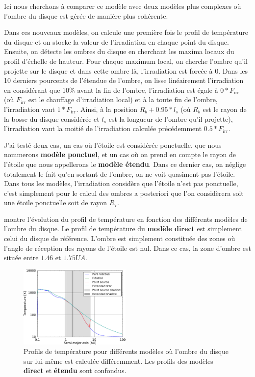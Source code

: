 Ici nous cherchons à comparer ce modèle avec deux modèles plus complexes où l'ombre du disque est gérée de manière plus cohérente. 

Dans ces nouveaux modèles, on calcule une première fois le profil de température du disque et on stocke la valeur de l'irradiation en chaque point du disque. Ensuite, on détecte les ombres du disque en cherchant les maxima locaux du profil d'échelle de hauteur. Pour chaque maximum local, on cherche l'ombre qu'il projette sur le disque et dans cette ombre là, l'irradiation est forcée à 0. Dans les 10 derniers pourcents de l'étendue de l'ombre, on lisse linéairement l'irradiation en considérant que 10\% avant la fin de l'ombre, l'irradiation est égale à $0 * F_\text{irr}$ (où $F_\text{irr}$ est le chauffage d'irradiation local) et à la toute fin de l'ombre, l'irradiation vaut $1 * F_\text{irr}$. Ainsi, à la position $R_b + 0.95 * l_s$ (où $R_b$ est le rayon de la bosse du disque considérée et $l_s$ est la longueur de l'ombre qu'il projette), l'irradiation vaut la moitié de l'irradiation calculée précédemment $0.5 * F_\text{irr}$. 

J'ai testé deux cas, un cas où l'étoile est considérée ponctuelle, que nous nommerons \textbf{modèle ponctuel}, et un cas où on prend en compte le rayon de l'étoile que nous appellerons le \textbf{modèle étendu}. Dans ce dernier cas, on néglige totalement le fait qu'en sortant de l'ombre, on ne voit quasiment pas l'étoile. Dans tous les modèles, l'irradiation considère que l'étoile n'est pas ponctuelle, c'est simplement pour le calcul des ombres a posteriori que l'on considèrera soit une étoile ponctuelle soit de rayon $R_\star$.

 montre l'évolution du profil de température en fonction des différents modèles de l'ombre du disque. Le profil de température du \textbf{modèle direct} est simplement celui du disque de référence. L'ombre est simplement constituée des zones où l'angle de réception des rayons de l'étoile est nul. Dans ce cas, la zone d'ombre est située entre $1.46$ et $1.75\unit{UA}$.

\begin{figure}[htbp]
\centering
\includegraphics[width=0.49\textwidth]{figure/shadow/fiducial_temperature_profile.pdf}

\caption{Profils de température pour différents modèles où l'ombre du disque sur lui-même est calculée différemment.  Les profils des modèles \textbf{direct} et \textbf{étendu} sont confondus. }\label{fig:shadow_temp_profile}
\end{figure}

